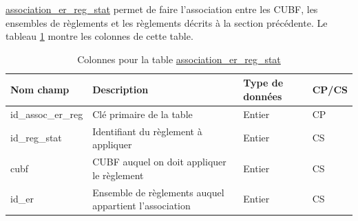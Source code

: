             \underline{association\_er\_reg\_stat} permet de faire l'association entre les \ac{CUBF}, les ensembles de règlements et les règlements décrits à la section précédente. Le tableau \ref{tab:definition_association_er_reg_stat} montre les colonnes de cette table.\par
            \begin{table}[h]
                \caption{Colonnes pour la table \underline{association\_er\_reg\_stat}}
            \label{tab:definition_association_er_reg_stat}
            \centering
            \begin{tabular}{m{}|m{}m{}m{}}
                    \hline
                    Nom champ & Description & Type de données & CP/CS  \\
                    \hline
                    id\_assoc\_er\_reg & Clé primaire de la table & Entier & CP \\  
                    id\_reg\_stat & Identifiant du règlement à appliquer & Entier & CS \\
                    cubf & \ac{CUBF} auquel on doit appliquer le règlement & Entier & CS\\
                    id\_er & Ensemble de règlements auquel appartient l'association & Entier & CS\\
                    \hline
            \end{tabular}
            
            \end{table}   
            \FloatBarrier
       
